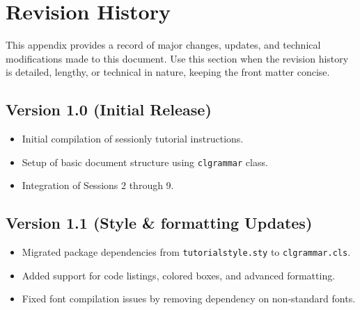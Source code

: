 \chapter{Revision History}

This appendix provides a record of major changes, updates, and technical modifications made to this document. Use this section when the revision history is detailed, lengthy, or technical in nature, keeping the front matter concise.

\section*{Version 1.0 (Initial Release)}
\begin{itemize}
    \item Initial compilation of sessionly tutorial instructions.
    \item Setup of basic document structure using \texttt{clgrammar} class.
    \item Integration of Sessions 2 through 9.
\end{itemize}

\section*{Version 1.1 (Style \& formatting Updates)}
\begin{itemize}
    \item Migrated package dependencies from \texttt{tutorialstyle.sty} to \texttt{clgrammar.cls}.
    \item Added support for code listings, colored boxes, and advanced formatting.
    \item Fixed font compilation issues by removing dependency on non-standard fonts.
\end{itemize}
